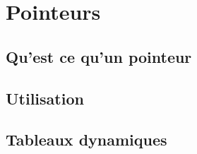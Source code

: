 \chapter{Pointeurs}

\section{Qu'est ce qu'un pointeur}

\section{Utilisation}

\section{Tableaux dynamiques}